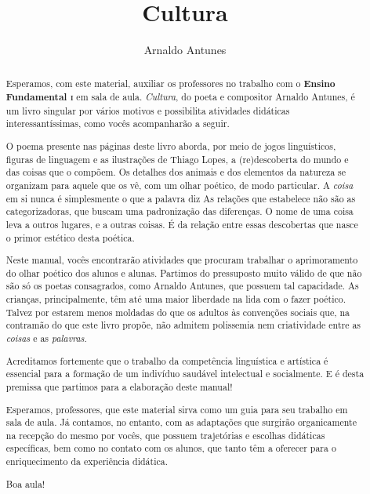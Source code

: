 \documentclass[11pt]{extarticle}
\newcommand{\AutorLivro}{Arnaldo Antunes}
\newcommand{\TituloLivro}{Cultura}
\newcommand{\colaborador}{Renier Silva}
\begin{document}
\title{\TituloLivro}
\author{\AutorLivro}
\def\authornotes{\colaborador}

\date{}
\maketitle

\tableofcontents


\begin{abstract}

Esperamos, com este material,
auxiliar os professores no trabalho com o \textbf{Ensino Fundamental \textsc{i}} em 
sala de aula. \textit{Cultura}, do poeta e compositor Arnaldo Antunes, é um livro singular
por vários motivos e possibilita atividades didáticas interessantíssimas,
como vocês acompanharão a seguir.

O poema presente nas páginas deste livro aborda, por meio de jogos linguísticos,
figuras de linguagem e as ilustrações de Thiago Lopes, 
a (re)descoberta do mundo e das coisas que o compõem. 
Os detalhes dos animais e dos elementos da natureza se organizam
para aquele que os vê, com um olhar poético, de modo particular. 
A \textit{coisa} em si nunca é simplesmente o que a palavra diz
As relações que estabelece não são as categorizadoras, que
buscam uma padronização das diferenças.
O nome de uma coisa leva a outros lugares, e a outras coisas.
É da relação entre essas descobertas que nasce o primor estético
desta poética. 

Neste manual, vocês encontrarão atividades que procuram 
trabalhar o aprimoramento do olhar poético dos alunos e alunas. 
Partimos do pressuposto muito válido de que não são só os poetas 
consagrados, como Arnaldo Antunes, que possuem tal capacidade. 
As crianças, principalmente, têm até 
uma maior liberdade na lida com o fazer poético. 
Talvez por estarem menos moldadas do que os adultos 
às convenções sociais que, na contramão do que este livro propõe,
não admitem polissemia nem criatividade entre as \textit{coisas}
e as \textit{palavras}. 

Acreditamos fortemente que o trabalho da competência linguística
e artística é essencial para a formação de um indivíduo saudável 
intelectual e socialmente. E é desta premissa que partimos para
a elaboração deste manual!

Esperamos, professores, que este material sirva como um guia 
para seu trabalho em sala de aula. Já contamos, no entanto, com as adaptações
que surgirão organicamente na recepção do mesmo por vocês, que possuem 
trajetórias e escolhas didáticas específicas, bem como no contato com os 
alunos, que tanto têm a oferecer para o enriquecimento da experiência didática.

Boa aula!

\end{abstract}
\end{document}
